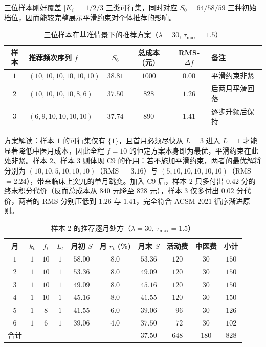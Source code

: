 \documentclass{MathorCupmodeling}
\begin{document}
三位样本刚好覆盖 $|K_i|=1/2/3$ 三类可行集，同时对应 $S_0 = 64/58/59$ 三种初始档位，因而能较完整展示平滑约束对个体推荐的影响。

\begin{table}[H]
\centering\small
\caption{三位样本在基准情景下的推荐方案（$\lambda=30$, $\tau_{\max}=1.5$）}\label{tab:q3-samples-rec}
\begin{tabular}{@{}c l c c c l@{}}
\toprule
样本 & 推荐频次序列 $f$ & $S_6$ & 总成本 (元) & RMS-$\Delta f$ & 备注 \\
\midrule
$1$ & $(10,10,10,10,10,10)$ & $38.81$ & $1000$ & $0.00$ & 平滑约束非紧 \\
$2$ & $(10,10,10,10,8,6)$ & $37.50$ & $828$ & $1.26$ & 后两月平滑回落 \\
$3$ & $(6,9,10,10,10,10)$ & $37.74$ & $890$ & $1.41$ & 逐步升频后保持 \\
\bottomrule
\end{tabular}
\end{table}

方案解读：样本 $1$ 的可行集仅有 $\{1\}$，且首月必须尽快从 $L=3$ 进入 $L=1$ 才能显著降低中医月成本，因此全程 $f=10$ 的恒定方案本身即为最优，平滑约束在此处非紧。样本 $2$、样本 $3$ 则体现 C9 的作用：若不施加平滑约束，两者的最优解将分别为 $(10,10,5,10,10,10)$（RMS $=3.16$）与 $(5,10,10,10,10,10)$（RMS $=2.24$），带来临床上突兀的单月跳变。加入 C9 后，样本 $2$ 只多付出 $0.42$ 分的终末积分代价（反而总成本从 $840$ 元降至 $828$ 元），样本 $3$ 仅多付出 $0.02$ 分代价，两者的 RMS 分别压低到 $1.26$ 与 $1.41$，完全符合 ACSM 2021 循序渐进原则。

\begin{table}[H]
\centering\small
\caption{样本 2 的推荐逐月处方（$\lambda=30$, $\tau_{\max}=1.5$）}\label{tab:q3-sample2}
\begin{tabular}{@{}c c c c c c c c c c@{}}
\toprule
月 & $k_t$ & $f_t$ & $L_t$ & 月初 $S$ & 月 $r_t$ (\%) & 月末 $S$ & 活动费 & 中医费 & 小计 \\
\midrule
$1$ & $1$ & $10$ & $1$ & $58.00$ & $8.0$ & $53.36$ & $120$ & $30$ & $150$ \\
$2$ & $1$ & $10$ & $1$ & $53.36$ & $8.0$ & $49.09$ & $120$ & $30$ & $150$ \\
$3$ & $1$ & $10$ & $1$ & $49.09$ & $8.0$ & $45.16$ & $120$ & $30$ & $150$ \\
$4$ & $1$ & $10$ & $1$ & $45.16$ & $8.0$ & $41.55$ & $120$ & $30$ & $150$ \\
$5$ & $1$ & $8$ & $1$ & $41.55$ & $6.0$ & $39.06$ & $\phantom{0}96$ & $30$ & $126$ \\
$6$ & $1$ & $6$ & $1$ & $39.06$ & $4.0$ & $37.50$ & $\phantom{0}72$ & $30$ & $102$ \\
\midrule
合计 & & & & & & $37.50$ & $648$ & $180$ & $828$ \\
\bottomrule
\end{tabular}
\end{table}
\end{document}
